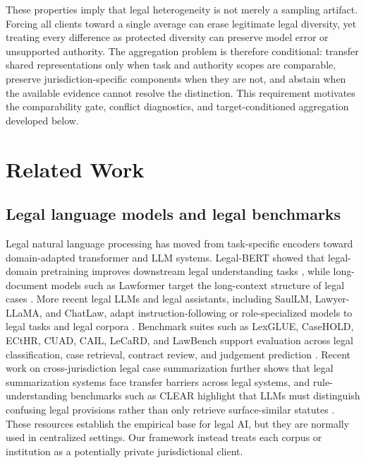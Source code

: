 \documentclass[preprint,12pt,authoryear]{elsarticle}
\begin{document}
These properties imply that legal heterogeneity is not merely a sampling artifact. Forcing all clients toward a single average can erase legitimate legal diversity, yet treating every difference as protected diversity can preserve model error or unsupported authority. The aggregation problem is therefore conditional: transfer shared representations only when task and authority scopes are comparable, preserve jurisdiction-specific components when they are not, and abstain when the available evidence cannot resolve the distinction. This requirement motivates the comparability gate, conflict diagnostics, and target-conditioned aggregation developed below.

\section{Related Work}

\subsection{Legal language models and legal benchmarks}
Legal natural language processing has moved from task-specific encoders toward domain-adapted transformer and LLM systems. Legal-BERT showed that legal-domain pretraining improves downstream legal understanding tasks \citep{chalkidis2020legalbert}, while long-document models such as Lawformer target the long-context structure of legal cases \citep{xiao2021lawformer}. More recent legal LLMs and legal assistants, including SaulLM, Lawyer-LLaMA, and ChatLaw, adapt instruction-following or role-specialized models to legal tasks and legal corpora \citep{colombo2024saullm,huang2023lawyerllama,cui2023chatlaw}. Benchmark suites such as LexGLUE, CaseHOLD, ECtHR, CUAD, CAIL, LeCaRD, and LawBench support evaluation across legal classification, case retrieval, contract review, and judgement prediction \citep{chalkidis2022lexglue,zheng2021casehold,chalkidis2019ecthr,hendrycks2021cuad,xiao2018cail,ma2021lecard,fei2023lawbench}. Recent work on cross-jurisdiction legal case summarization further shows that legal summarization systems face transfer barriers across legal systems, and rule-understanding benchmarks such as CLEAR highlight that LLMs must distinguish confusing legal provisions rather than only retrieve surface-similar statutes \citep{tyss2024beyond,xu2025clear}. These resources establish the empirical base for legal AI, but they are normally used in centralized settings. Our framework instead treats each corpus or institution as a potentially private jurisdictional client.
\end{document}

